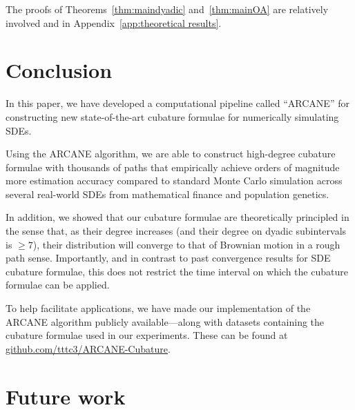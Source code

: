 \documentclass[11pt, letterpaper]{article}
\theoremstyle{definition}
\theoremstyle{remark}
\newcommand{\short}{ARCANE\xspace}
\begin{document}
The proofs of Theorems~\ref{thm:maindyadic} and~\ref{thm:mainOA} are relatively involved and in Appendix~\ref{app:theoretical results}.

\section{Conclusion}

In this paper, we have developed a computational pipeline called ``\short'' for constructing new state-of-the-art cubature formulae for numerically simulating SDEs.

Using the \short algorithm, we are able to construct high-degree cubature formulae with thousands of paths that empirically achieve orders of magnitude more estimation accuracy compared to standard Monte Carlo simulation across several real-world SDEs from mathematical finance and population genetics.

In addition, we showed that our cubature formulae are theoretically principled in the sense that, as their degree increases (and their degree on dyadic subintervals is $\geq 7$), their distribution will converge to that of Brownian motion in a rough path sense.
Importantly, and in contrast to past convergence results for SDE cubature formulae, this does not restrict the time interval on which the cubature formulae can be applied.

To help facilitate applications, we have made our implementation of the \short algorithm publicly available---along with datasets containing the cubature formulae used in our experiments. These can be found at \href{https://github.com/tttc3/ARCANE-Cubature}{github.com/tttc3/ARCANE-Cubature}.

\section{Future work}
\end{document}
